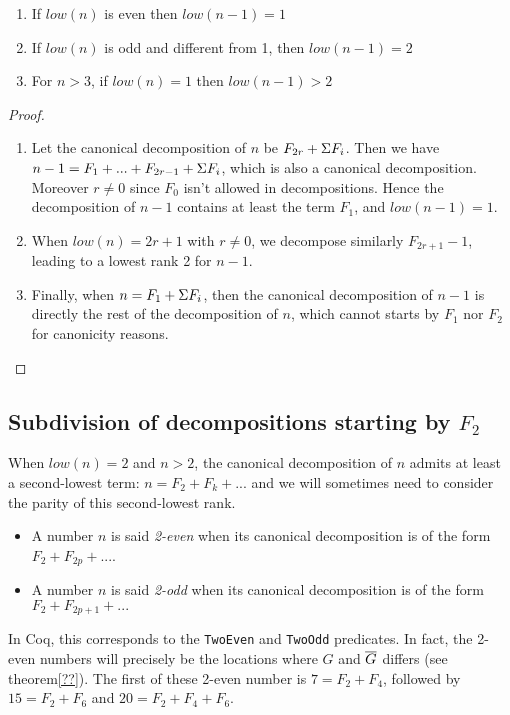 \documentclass[a4paper,11pt]{article}
\begin{document}
\begin{theorem}
\noindent
\begin{enumerate}
\item If $low(n)$ is even then $low(n-1) = 1$
\item If $low(n)$ is odd and different from 1, then $low(n-1) = 2$
\item For $n>3$, if $low(n)=1$ then $low(n-1)>2$
\end{enumerate}
\end{theorem}
\begin{proof}
\noindent
\begin{enumerate}
\item Let the canonical decomposition of $n$ be $F_{2r} +
  \Sigma F_i$. Then we have $n-1 = F_1 + ... + F_{2r-1} + \Sigma F_i$, which
 is also a canonical decomposition. Moreover $r\neq 0$ since $F_0$
 isn't allowed in decompositions. Hence the decomposition of $n-1$
 contains at least the term $F_1$, and $low(n-1)=1$.
\item When $low(n) = 2r+1$ with $r\neq 0$, we decompose
 similarly $F_{2r+1}-1$, leading to a lowest rank 2 for $n-1$.
\item Finally, when $n = F_1 + \Sigma F_i$, then the canonical decomposition
  of $n-1$ is directly the rest of the decomposition of $n$, which
  cannot starts by $F_1$ nor $F_2$ for canonicity reasons.
\end{enumerate}
\end{proof}

\subsection{Subdivision of decompositions starting by $F_2$}

When $low(n)=2$ and $n>2$, the canonical decomposition of $n$
admits at least a second-lowest term: $n = F_2 + F_k + ...$ and we
will sometimes
need to consider the parity of this second-lowest rank.

\begin{definition}
\noindent
\begin{itemize}
\item A number $n$ is said \emph{2-even} when its canonical decomposition
  is of the form $F_2 + F_{2p} + ...$.
\item A number $n$ is said \emph{2-odd} when its canonical decomposition
  is of the form $F_2 + F_{2p+1} + ...$
\end{itemize}
\end{definition}
In Coq, this corresponds to the {\tt TwoEven} and {\tt TwoOdd}
predicates.
In fact, the 2-even numbers will precisely be the locations where
$G$ and $\overline{G}$ differs (see theorem\ref{??}). The first of these 2-even number is
$7 = F_2+F_4$, followed by $15 = F_2 + F_6$ and $20 = F_2+F_4+F_6$.
\end{document}
